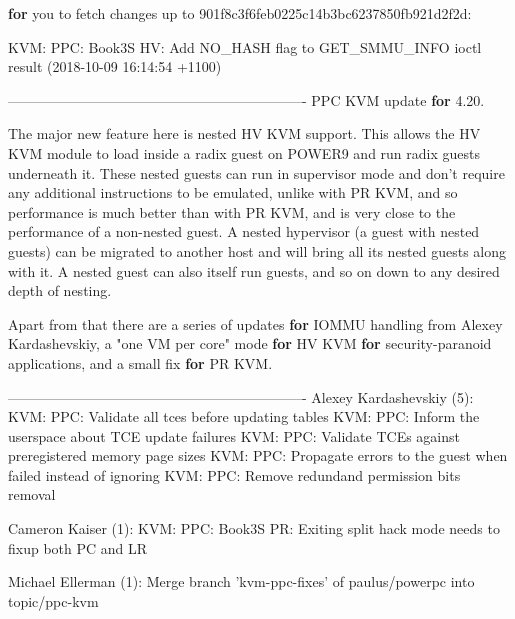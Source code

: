 \documentclass[landscape, 14pt]{report}
\newenvironment{Shaded}{}{}
\newcommand{\DecValTok}[1]{\textcolor[rgb]{0.25,0.63,0.44}{#1}}
\newcommand{\FloatTok}[1]{\textcolor[rgb]{0.25,0.63,0.44}{#1}}
\newcommand{\StringTok}[1]{\textcolor[rgb]{0.25,0.44,0.63}{#1}}
\newcommand{\ControlFlowTok}[1]{\textcolor[rgb]{0.00,0.44,0.13}{\textbf{#1}}}
\newcommand{\NormalTok}[1]{#1}
\begin{document}
\begin{Shaded}
\begin{Highlighting}[]
\ControlFlowTok{for}\NormalTok{ you to fetch changes up to 901f8c3f6feb0225c14b3bc6237850fb921d2f2d:}

\NormalTok{  KVM: PPC: Book3S HV: Add NO_HASH flag to GET_SMMU_INFO ioctl result (}\DecValTok{2018-10-09} \DecValTok{16}\NormalTok{:}\DecValTok{14}\NormalTok{:}\DecValTok{54}\NormalTok{ +}\DecValTok{1100}\NormalTok{)}

\NormalTok{----------------------------------------------------------------}
\NormalTok{PPC KVM update }\ControlFlowTok{for} \DecValTok{4}\NormalTok{.}\FloatTok{20.}

\NormalTok{The major new feature here is nested HV KVM support.  This allows the}
\NormalTok{HV KVM module to load inside a radix guest on POWER9 and run radix}
\NormalTok{guests underneath it.  These nested guests can run in supervisor mode}
\NormalTok{and don't require any additional instructions to be emulated, unlike}
\NormalTok{with PR KVM, and so performance is much better than with PR KVM, and}
\NormalTok{is very close to the performance of a non-nested guest.  A nested}
\NormalTok{hypervisor (a guest with nested guests) can be migrated to another}
\NormalTok{host and will bring all its nested guests along with it.  A nested}
\NormalTok{guest can also itself run guests, and so on down to any desired depth}
\NormalTok{of nesting.}

\NormalTok{Apart from that there are a series of updates }\ControlFlowTok{for}\NormalTok{ IOMMU handling from}
\NormalTok{Alexey Kardashevskiy, a }\StringTok{"one VM per core"}\NormalTok{ mode }\ControlFlowTok{for}\NormalTok{ HV KVM }\ControlFlowTok{for}
\NormalTok{security-paranoid applications, and a small fix }\ControlFlowTok{for}\NormalTok{ PR KVM.}

\NormalTok{----------------------------------------------------------------}
\NormalTok{Alexey Kardashevskiy (}\DecValTok{5}\NormalTok{):}
\NormalTok{      KVM: PPC: Validate all tces before updating tables}
\NormalTok{      KVM: PPC: Inform the userspace about TCE update failures}
\NormalTok{      KVM: PPC: Validate TCEs against preregistered memory page sizes}
\NormalTok{      KVM: PPC: Propagate errors to the guest when failed instead of ignoring}
\NormalTok{      KVM: PPC: Remove redundand permission bits removal}

\NormalTok{Cameron Kaiser (}\DecValTok{1}\NormalTok{):}
\NormalTok{      KVM: PPC: Book3S PR: Exiting split hack mode needs to fixup both PC and LR}

\NormalTok{Michael Ellerman (}\DecValTok{1}\NormalTok{):}
\NormalTok{      Merge branch 'kvm-ppc-fixes' of paulus/powerpc into topic/ppc-kvm}


\end{Highlighting}
\end{Shaded}
\end{document}
